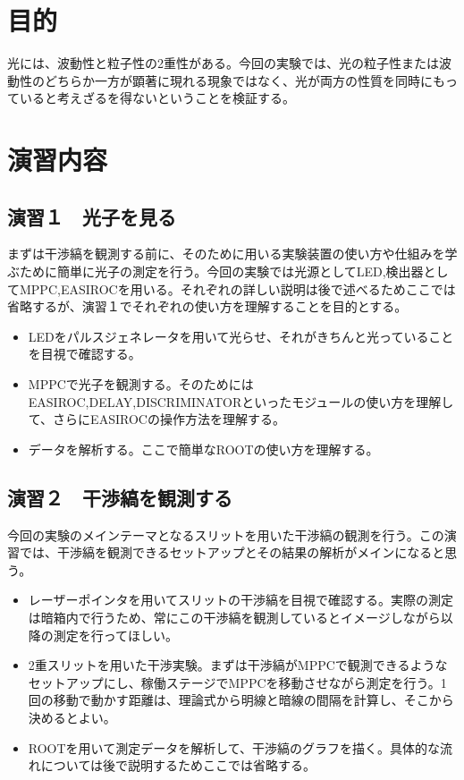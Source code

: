 \documentclass[10pt,a4j]{jarticle}
\begin{document}
\tableofcontents
\clearpage

\section{目的}
光には、波動性と粒子性の2重性がある。今回の実験では、光の粒子性または波動性のどちらか一方が顕著に現れる現象ではなく、光が両方の性質を同時にもっていると考えざるを得ないということを検証する。

\section{演習内容}

\subsection{演習１　光子を見る}
まずは干渉縞を観測する前に、そのために用いる実験装置の使い方や仕組みを学ぶために簡単に光子の測定を行う。今回の実験では光源としてLED,検出器としてMPPC,EASIROCを用いる。それぞれの詳しい説明は後で述べるためここでは省略するが、演習１でそれぞれの使い方を理解することを目的とする。
\begin{itemize}
\item LEDをパルスジェネレータを用いて光らせ、それがきちんと光っていることを目視で確認する。
\item MPPCで光子を観測する。そのためにはEASIROC,DELAY,DISCRIMINATORといったモジュールの使い方を理解して、さらにEASIROCの操作方法を理解する。
\item データを解析する。ここで簡単なROOTの使い方を理解する。
\end{itemize}

\subsection{演習２　干渉縞を観測する}
今回の実験のメインテーマとなるスリットを用いた干渉縞の観測を行う。この演習では、干渉縞を観測できるセットアップとその結果の解析がメインになると思う。
\begin{itemize}
\item レーザーポインタを用いてスリットの干渉縞を目視で確認する。実際の測定は暗箱内で行うため、常にこの干渉縞を観測しているとイメージしながら以降の測定を行ってほしい。
\item 2重スリットを用いた干渉実験。まずは干渉縞がMPPCで観測できるようなセットアップにし、稼働ステージでMPPCを移動させながら測定を行う。1回の移動で動かす距離は、理論式から明線と暗線の間隔を計算し、そこから決めるとよい。
\item ROOTを用いて測定データを解析して、干渉縞のグラフを描く。具体的な流れについては後で説明するためここでは省略する。　
\end{itemize}
\end{document}
